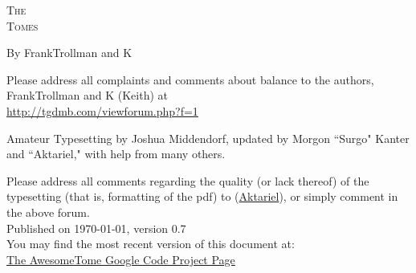 \pagestyle{plain}

\begin{center} \Huge

\textsc{The\\
Tomes\\
}\end{center}



\vspace{2cm}
\begin{center}\large By FrankTrollman and K\end{center}


\newpage

\vspace*{4in}

\noindent Please address all complaints and comments about balance to the authors, FrankTrollman and K (Keith) at\\
{\color{blue} \href{http://tgdmb.com/viewforum.php?f=1}{http://tgdmb.com/viewforum.php?f=1}}

\vspace{0.2in}



\noindent Amateur Typesetting by Joshua Middendorf, updated by Morgon ``Surgo" Kanter and ``Aktariel," with help from many others.\\

\vspace{0.15in}

\noindent Please address all comments regarding the quality (or lack thereof) of the typesetting (that is, formatting of the pdf) to (\href{mailto:aktariel@gmail.com}{Aktariel}), or simply comment in the above forum.\\





\vspace{1in}
\noindent Published on \today, version 0.7\\
\noindent You may find the most recent version of this document at:\\
{\color{blue} \href{http://code.google.com/p/awesometome/downloads/list}{The AwesomeTome Google Code Project Page}}

\newpage
